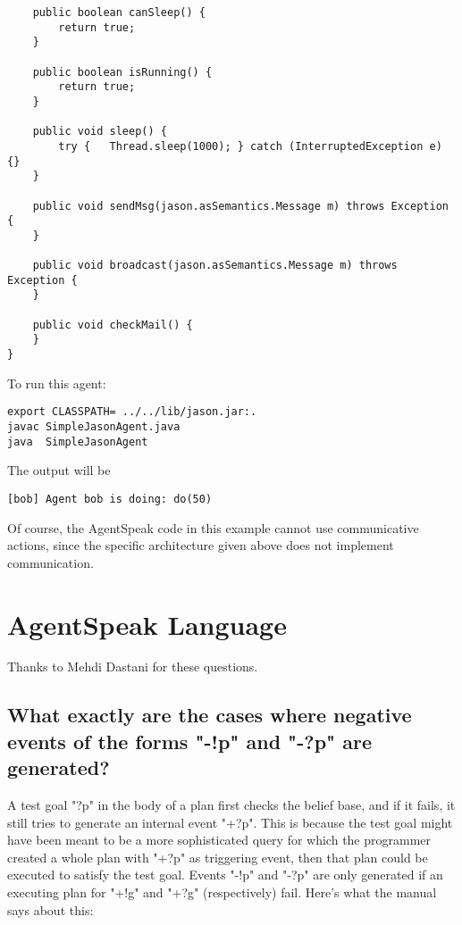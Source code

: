 \documentclass{article}
\begin{document}
\begin{description}
\begin{verbatim}
    public boolean canSleep() {
        return true;
    }

    public boolean isRunning() {
        return true;
    }

    public void sleep() {
    	try {   Thread.sleep(1000); } catch (InterruptedException e) {}
    }
    
    public void sendMsg(jason.asSemantics.Message m) throws Exception {
    }

    public void broadcast(jason.asSemantics.Message m) throws Exception {
    }

    public void checkMail() {
    }
}
\end{verbatim}

To run this agent:
\begin{verbatim}
export CLASSPATH= ../../lib/jason.jar:.
javac SimpleJasonAgent.java
java  SimpleJasonAgent
\end{verbatim}

The output will be 
\begin{verbatim}
[bob] Agent bob is doing: do(50)
\end{verbatim}

Of course, the AgentSpeak code in this example cannot use communicative
actions, since the specific architecture given above does not implement
communication.

\section{AgentSpeak Language}

Thanks to Mehdi Dastani for these questions.

\subsection{What exactly are the cases where negative events of the forms
  "-!p" and "-?p" are generated?}

A test goal "?p" in the body of a plan first checks the belief base,
and if it fails, it still tries to generate an internal event
"+?p". This is because the test goal might have been meant to be a
more sophisticated query for which the programmer created a whole plan
with "+?p" as triggering event, then that plan could be executed to
satisfy the test goal. Events "-!p" and "-?p" are only generated if an
executing plan for "+!g" and "+?g" (respectively) fail. Here's what
the manual says about this:


\end{description}
\end{document}
